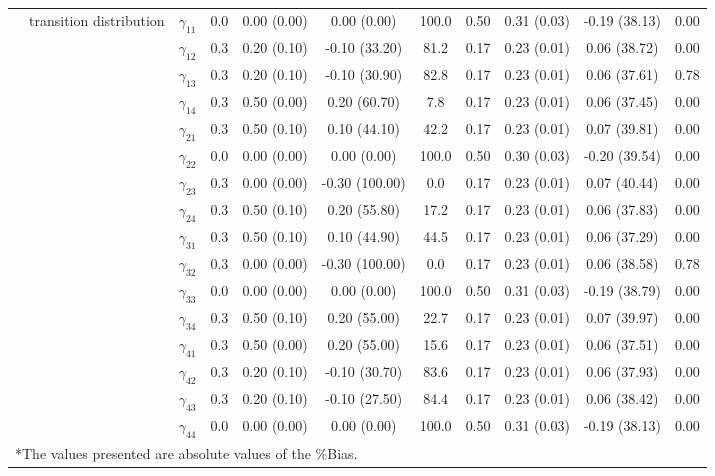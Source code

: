 \begin{table}[h]
{\begin{tabular}{ccccccccccc}
 & \multirow{16}{*}{transition distribution} & $\gamma_{11}$ & 0.0 & 0.00 (0.00) & 0.00 (0.00) & 100.0 & 0.50 & 0.31 (0.03) & -0.19 (38.13) & 0.00 \\
 &  & $\gamma_{12}$ & 0.3 & 0.20 (0.10) & -0.10 (33.20) & 81.2 & 0.17 & 0.23 (0.01) & 0.06 (38.72) & 0.00 \\
 &  & $\gamma_{13}$ & 0.3 & 0.20 (0.10) & -0.10 (30.90) & 82.8 & 0.17 & 0.23 (0.01) & 0.06 (37.61) & 0.78 \\
 &  & $\gamma_{14}$ & 0.3 & 0.50 (0.00) & 0.20 (60.70) & 7.8 & 0.17 & 0.23 (0.01) & 0.06 (37.45) & 0.00 \\
 &  & $\gamma_{21}$ & 0.3 & 0.50 (0.10) & 0.10 (44.10) & 42.2 & 0.17 & 0.23 (0.01) & 0.07 (39.81) & 0.00 \\
 &  & $\gamma_{22}$ & 0.0 & 0.00 (0.00) & 0.00 (0.00) & 100.0 & 0.50 & 0.30 (0.03) & -0.20 (39.54) & 0.00 \\
 &  & $\gamma_{23}$ & 0.3 & 0.00 (0.00) & -0.30 (100.00) & 0.0 & 0.17 & 0.23 (0.01) & 0.07 (40.44) & 0.00 \\
 &  & $\gamma_{24}$ & 0.3 & 0.50 (0.10) & 0.20 (55.80) & 17.2 & 0.17 & 0.23 (0.01) & 0.06 (37.83) & 0.00 \\
 &  & $\gamma_{31}$ & 0.3 & 0.50 (0.10) & 0.10 (44.90) & 44.5 & 0.17 & 0.23 (0.01) & 0.06 (37.29) & 0.00 \\
 &  & $\gamma_{32}$ & 0.3 & 0.00 (0.00) & -0.30 (100.00) & 0.0 & 0.17 & 0.23 (0.01) & 0.06 (38.58) & 0.78 \\
 &  & $\gamma_{33}$ & 0.0 & 0.00 (0.00) & 0.00 (0.00) & 100.0 & 0.50 & 0.31 (0.03) & -0.19 (38.79) & 0.00 \\
 &  & $\gamma_{34}$ & 0.3 & 0.50 (0.10) & 0.20 (55.00) & 22.7 & 0.17 & 0.23 (0.01) & 0.07 (39.97) & 0.00 \\
 &  & $\gamma_{41}$ & 0.3 & 0.50 (0.00) & 0.20 (55.00) & 15.6 & 0.17 & 0.23 (0.01) & 0.06 (37.51) & 0.00 \\
 &  & $\gamma_{42}$ & 0.3 & 0.20 (0.10) & -0.10 (30.70) & 83.6 & 0.17 & 0.23 (0.01) & 0.06 (37.93) & 0.00 \\
 &  & $\gamma_{43}$ & 0.3 & 0.20 (0.10) & -0.10 (27.50) & 84.4 & 0.17 & 0.23 (0.01) & 0.06 (38.42) & 0.00 \\
 &  & $\gamma_{44}$ & 0.0 & 0.00 (0.00) & 0.00 (0.00) & 100.0 & 0.50 & 0.31 (0.03) & -0.19 (38.13) & 0.00 \\

\bottomrule 
\multicolumn{10}{l}{*The values presented are absolute values of the \%Bias.}
\end{tabular}}
\label{tgr1_1}
\end{table}

